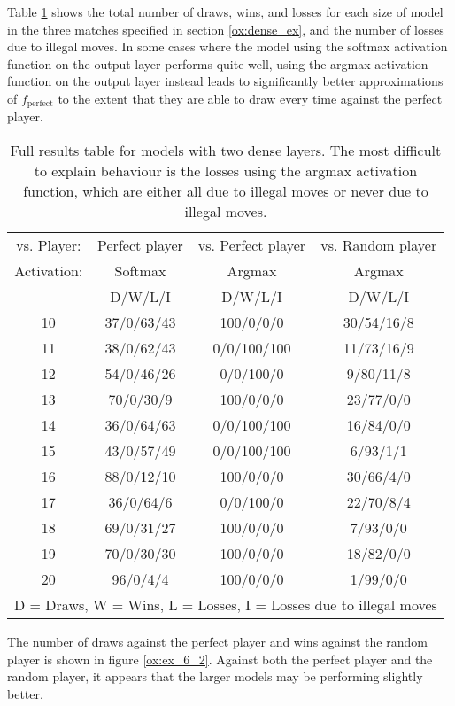 \documentclass{somasmsc}
\begin{document}
\begin{exa}
Table \ref{ox:t1} shows the total number of draws, wins, and losses for each size of model in the three matches specified in section \ref{ox:dense_ex}, and the number of losses due to illegal moves. In some cases where the model using the softmax activation function on the output layer performs quite well, using the argmax activation function on the output layer instead leads to significantly better approximations of $f_{\text{perfect}}$ to the extent that they are able to draw every time against the perfect player.

\begin{table}[h!]
\centering
\begin{tabular}{ |c|c|c|c| }
 \hline
  vs. Player: & Perfect player & vs. Perfect player & vs. Random player \\
  Activation: & Softmax & Argmax & Argmax \\
  & D/W/L/I & D/W/L/I & D/W/L/I \\
 \hline
 10 & 37/0/63/43 & 100/0/0/0   & 30/54/16/8 \\
 11 & 38/0/62/43 & 0/0/100/100 & 11/73/16/9 \\
 12 & 54/0/46/26 & 0/0/100/0   & 9/80/11/8  \\
 13 & 70/0/30/9  & 100/0/0/0   & 23/77/0/0  \\
 14 & 36/0/64/63 & 0/0/100/100 & 16/84/0/0  \\
 15 & 43/0/57/49 & 0/0/100/100 & 6/93/1/1   \\
 16 & 88/0/12/10 & 100/0/0/0   & 30/66/4/0  \\
 17 & 36/0/64/6  & 0/0/100/0   & 22/70/8/4  \\
 18 & 69/0/31/27 & 100/0/0/0   & 7/93/0/0   \\
 19 & 70/0/30/30 & 100/0/0/0   & 18/82/0/0  \\
 20 & 96/0/4/4   & 100/0/0/0   & 1/99/0/0   \\
 \hline
 \multicolumn{4}{|c|}{D = Draws, W = Wins, L = Losses, I = Losses due to illegal moves} \\
 \hline
\end{tabular}
\caption{Full results table for models with two dense layers. The most difficult to explain behaviour is the losses using the argmax activation function, which are either all due to illegal moves or never due to illegal moves.}
\label{ox:t1}
\end{table}

The number of draws against the perfect player and wins against the random player is shown in figure \ref{ox:ex_6_2}. Against both the perfect player and the random player, it appears that the larger models may be performing slightly better.


\end{exa}
\end{document}
